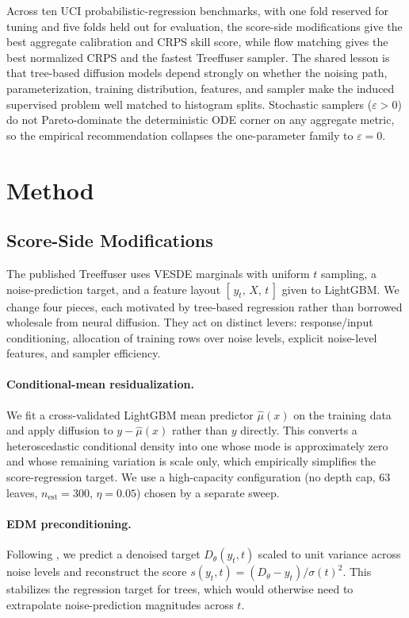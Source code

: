 \documentclass{tpm2026}
\begin{document}
Across ten UCI probabilistic-regression benchmarks, with one fold reserved for tuning and five folds held out for evaluation, the score-side modifications give the best aggregate calibration and CRPS skill score, while flow matching gives the best normalized CRPS and the fastest Treeffuser sampler. The shared lesson is that tree-based diffusion models depend strongly on whether the noising path, parameterization, training distribution, features, and sampler make the induced supervised problem well matched to histogram splits. Stochastic samplers ($\varepsilon > 0$) do not Pareto-dominate the deterministic ODE corner on any aggregate metric, so the empirical recommendation collapses the one-parameter family to $\varepsilon = 0$.

\section{Method}\label{sec:method}

\subsection{Score-Side Modifications}\label{sec:score-side}
The published Treeffuser uses VESDE marginals with uniform $t$ sampling, a noise-prediction target, and a feature layout $[\,y_t,\,X,\,t\,]$ given to LightGBM. We change four pieces, each motivated by tree-based regression rather than borrowed wholesale from neural diffusion. They act on distinct levers: response/input conditioning, allocation of training rows over noise levels, explicit noise-level features, and sampler efficiency.

\paragraph{Conditional-mean residualization.} We fit a cross-validated LightGBM mean predictor $\hat{\mu}(x)$ on the training data and apply diffusion to $y - \hat{\mu}(x)$ rather than $y$ directly. This converts a heteroscedastic conditional density into one whose mode is approximately zero and whose remaining variation is scale only, which empirically simplifies the score-regression target. We use a high-capacity configuration (no depth cap, 63 leaves, $n_{\text{est}}{=}300$, $\eta{=}0.05$) chosen by a separate sweep.

\paragraph{EDM preconditioning.} Following \citet{karras2022edm}, we predict a denoised target $D_\theta(y_t, t)$ scaled to unit variance across noise levels and reconstruct the score $s(y_t, t) = (D_\theta - y_t)/\sigma(t)^2$. This stabilizes the regression target for trees, which would otherwise need to extrapolate noise-prediction magnitudes across $t$.
\end{document}
